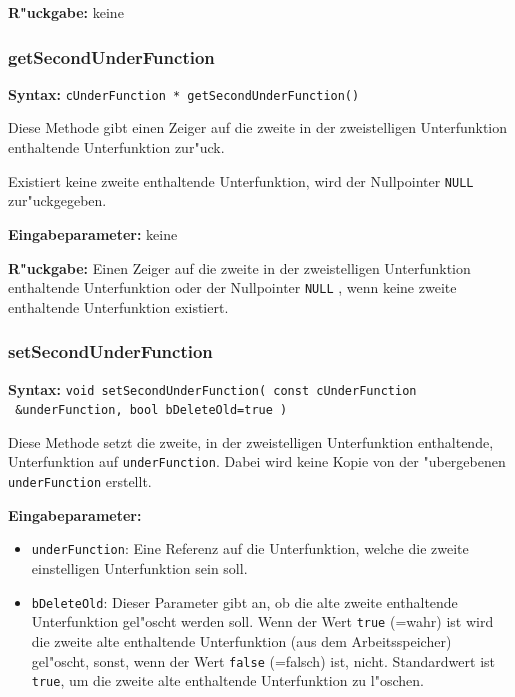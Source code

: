 \bigskip\noindent
\textbf{R"uckgabe:} keine


\subsubsection{getSecondUnderFunction}

\textbf{Syntax:} \verb|cUnderFunction * getSecondUnderFunction()|

\bigskip\noindent
Diese Methode gibt einen Zeiger auf die zweite in der zweistelligen Unterfunktion enthaltende Unterfunktion zur"uck.

Existiert keine zweite enthaltende Unterfunktion, wird der Nullpointer \verb|NULL| zur"uckgegeben.

\bigskip\noindent
\textbf{Eingabeparameter:} keine

\bigskip\noindent
\textbf{R"uckgabe:} Einen Zeiger auf die zweite in der zweistelligen Unterfunktion enthaltende Unterfunktion oder der Nullpointer \verb|NULL| , wenn keine zweite enthaltende Unterfunktion existiert.


\subsubsection{setSecondUnderFunction}

\textbf{Syntax:} \verb|void setSecondUnderFunction( const cUnderFunction| \\\verb| &underFunction, bool bDeleteOld=true )|

\bigskip\noindent
Diese Methode setzt die zweite, in der zweistelligen Unterfunktion enthaltende, Unterfunktion auf \verb|underFunction|. Dabei wird keine Kopie von der "ubergebenen \verb|underFunction| erstellt.

\bigskip\noindent
\textbf{Eingabeparameter:}
\begin{itemize}
 \item \verb|underFunction|: Eine Referenz auf die Unterfunktion, welche die zweite einstelligen Unterfunktion sein soll.
 \item \verb|bDeleteOld|: Dieser Parameter gibt an, ob die alte zweite enthaltende Unterfunktion gel"oscht werden soll. Wenn der Wert \verb|true| (=wahr) ist wird die zweite alte enthaltende Unterfunktion (aus dem Arbeitsspeicher) gel"oscht, sonst, wenn der Wert \verb|false| (=falsch) ist, nicht. Standardwert ist \verb|true|, um die zweite alte enthaltende Unterfunktion zu l"oschen.
\end{itemize}

